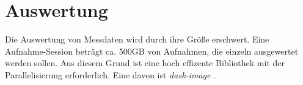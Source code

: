 \chapter{Auswertung}
Die Auswertung von Messdaten wird durch ihre Größe erschwert. Eine Aufnahme-Session beträgt ca. 500GB von Aufnahmen, die einzeln ausgewertet werden sollen. Aus diesem Grund ist eine hoch effizente Bibliothek mit der Parallelisierung erforderlich. Eine davon ist \textit{dask-image} \cite{dask-library}.
%     
